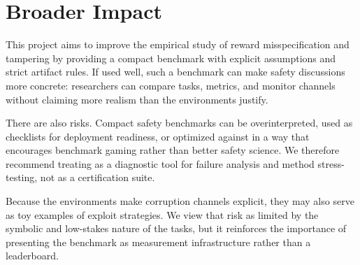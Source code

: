 \section{Broader Impact}
This project aims to improve the empirical study of reward misspecification and
tampering by providing a compact benchmark with explicit assumptions and strict
artifact rules. If used well, such a benchmark can make safety discussions more
concrete: researchers can compare tasks, metrics, and monitor channels without
claiming more realism than the environments justify.

There are also risks. Compact safety benchmarks can be overinterpreted, used as
checklists for deployment readiness, or optimized against in a way that
encourages benchmark gaming rather than better safety science. We therefore
recommend treating \framework as a diagnostic tool for failure analysis and
method stress-testing, not as a certification suite.

Because the environments make corruption channels explicit, they may also serve
as toy examples of exploit strategies. We view that risk as limited by the
symbolic and low-stakes nature of the tasks, but it reinforces the importance of
presenting the benchmark as measurement infrastructure rather than a leaderboard.
